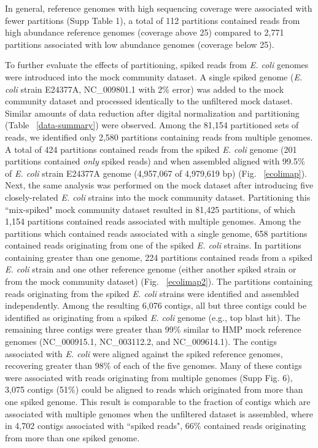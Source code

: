 \documentclass[11pt]{article} %
\begin{document}

In general, reference genomes with high sequencing coverage were
associated with fewer partitions (Supp Table 1), a
total of 112 partitions contained reads from high abundance reference
genomes (coverage above 25) compared to 2,771 partitions associated
with low abundance genomes (coverage below 25).


To further evaluate the effects of partitioning, spiked reads from
\emph{E. coli} genomes were introduced into the mock community
dataset. A single spiked genome (\emph{E. coli} strain E24377A,
NC\_009801.1 with 2\% error) was added to the mock community dataset
and processed identically to the unfiltered mock dataset.  Similar
amounts of data reduction after digital normalization and partitioning
(Table ~\ref{data-summary}) were observed.  Among the 81,154
partitioned sets of reads, we identified only 2,580 partitions
containing reads from multiple genomes.  A total of 424 partitions
contained reads from the spiked \emph{E. coli} genome (201 partitions
contained \emph{only} spiked reads) and when assembled aligned with
99.5\% of \emph{E. coli} strain E24377A genome (4,957,067 of 4,979,619
bp) (Fig. ~\ref{ecolimap}).  Next, the same analysis was performed on
the mock dataset after introducing five closely-related \emph{E. coli}
strains into the mock community dataset.  Partitioning this
``mix-spiked" mock community dataset resulted in 81,425 partitions, of
which 1,154 partitions contained reads associated with multiple
genomes.  Among the partitions which contained reads associated with a
single genome, 658 partitions contained reads originating from one of
the spiked \emph{E. coli} strains.  In partitions containing greater
than one genome, 224 partitions contained reads from a spiked
\emph{E. coli} strain and one other reference genome (either another
spiked strain or from the mock community dataset)
(Fig. ~\ref{ecolimap2}).  The partitions containing reads originating
from the spiked \emph{E. coli} strains were identified and assembled
independently.  Among the resulting 6,076 contigs, all but three
contigs could be identified as originating from a spiked
\emph{E. coli} genome (e.g., top blast hit).  The remaining three
contigs were greater than 99\% similar to HMP mock reference genomes
(NC\_000915.1, NC\_003112.2, and NC\_009614.1).  The contigs
associated with \emph{E. coli} were aligned against the spiked
reference genomes, recovering greater than 98\% of each of the five
genomes.  Many of these contigs were associated with reads originating
from multiple genomes (Supp Fig. 6), 3,075
contigs (51\%) could be aligned to reads which originated from more
than one spiked genome.  This result is comparable to the fraction of
contigs which are associated with multiple genomes when the unfiltered
dataset is assembled, where in 4,702 contigs associated with ``spiked
reads", 66\% contained reads originating from more than one spiked
genome.
\end{document}
